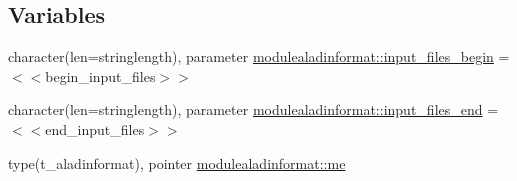 \subsection*{Variables}
\begin{DoxyCompactItemize}
\item 
character(len=stringlength), parameter \mbox{\hyperlink{namespacemodulealadinformat_a4e98c66850b0ed94ddb033e7aa090e44}{modulealadinformat\+::input\+\_\+files\+\_\+begin}} = \textquotesingle{}$<$$<$begin\+\_\+input\+\_\+files$>$$>$\textquotesingle{}
\item 
character(len=stringlength), parameter \mbox{\hyperlink{namespacemodulealadinformat_a1b5e192f0393399d4e3f5ee7791fef49}{modulealadinformat\+::input\+\_\+files\+\_\+end}} = \textquotesingle{}$<$$<$end\+\_\+input\+\_\+files$>$$>$\textquotesingle{}
\item 
type(t\+\_\+aladinformat), pointer \mbox{\hyperlink{namespacemodulealadinformat_a3680b6b225bce535beb96cad9fff81cb}{modulealadinformat\+::me}}
\end{DoxyCompactItemize}
